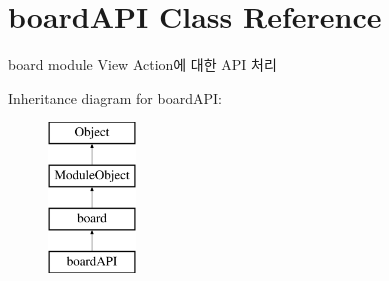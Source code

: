\hypertarget{classboardAPI}{}\section{board\+A\+P\+I Class Reference}
\label{classboardAPI}


board module View Action에 대한 A\+P\+I 처리  


Inheritance diagram for board\+A\+P\+I\+:\begin{figure}[H]
\begin{center}
\leavevmode
\includegraphics[height=4.000000cm]{classboardAPI}
\end{center}
\end{figure}
